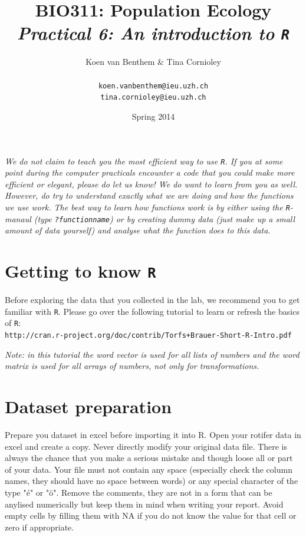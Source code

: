 \documentclass{article}\usepackage[]{graphicx}\usepackage[]{color}
\title{BIO311: Population Ecology\\ \textit{Practical 6: An introduction to \texttt{R}}}
\author{Koen van Benthem \& Tina Cornioley\\\\
\tt{koen.vanbenthem@ieu.uzh.ch}\\ \tt{tina.cornioley@ieu.uzh.ch}}
\date{Spring 2014}
\begin{document}
\maketitle
\tableofcontents
\vspace{3cm}
\begin{mdframed}
\textit{We do not claim to teach you the most efficient way to use \texttt{R}. If you at some point during the computer practicals encounter a code that you could make more efficient or elegant, please do let us know! We do want to learn from you as well.\\[1.5ex] However, do try to understand exactly what we are doing and how the functions we use work. The best way to learn how functions work is by either using the \texttt{R}-manaul (type \texttt{?functionname}) or by creating dummy data (just make up a small amount of data yourself) and analyse what the function does to this data.}
\end{mdframed}
\newpage
\section{Getting to know \texttt{R}}
Before exploring the data that you collected in the lab, we recommend you to get familiar with \texttt{R}. Please go over the following tutorial to learn or refresh the basics of \texttt{R}:\\

\texttt{http://cran.r-project.org/doc/contrib/Torfs+Brauer-Short-R-Intro.pdf}
\vspace{1.5ex}

\textit{Note: in this tutorial the word vector is used for all lists of numbers and the word matrix is used for all arrays of numbers, not only for transformations.}

\section{Dataset preparation}
Prepare you dataset in excel before importing it into R. Open your rotifer data in excel and create a copy. Never directly modify your original data file. There is always the chance that you make a serious mistake and though loose all or part of your data. Your file must not contain any space (especially check the column names, they should have no space between words) or any special character of the type "\'e" or "\"o". Remove the comments, they are not in a form that can be anylised numerically but keep them in mind when writing your report. Avoid empty cells by filling them with NA if you do not know the value for that cell or zero if appropriate. 
\end{document}
